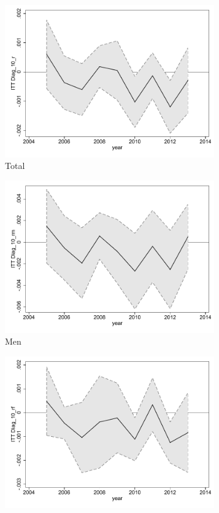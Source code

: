 \documentclass[a4paper ]{article}
\begin{document}
\begin{figure}[h!]
	\centering
	\begin{subfigure}[t]{0.31\textwidth}
		\centering
		\includegraphics[width=0.99\textwidth]{R1_LC_Diag_10_r}
		\caption{Total}		
	\end{subfigure}
	\begin{subfigure}[t]{0.31\textwidth}
		\centering
		\includegraphics[width=0.99\textwidth]{R1_LC_Diag_10_rm}
		\caption{Men}		
	\end{subfigure}
	\quad
	\begin{subfigure}[t]{0.31\textwidth}
		\centering
		\includegraphics[width=0.99\textwidth]{R1_LC_Diag_10_rf}

\end{subfigure}
\end{figure}
\end{document}
